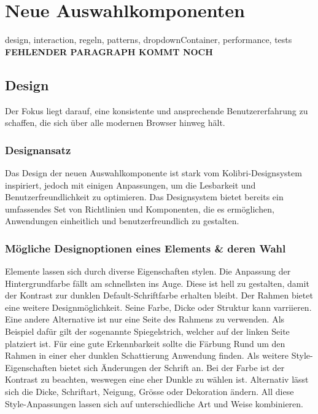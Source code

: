 \chapter{Neue Auswahlkomponenten}
\label{chap:newComponent}


design, interaction, regeln, patterns, dropdownContainer, performance, tests
{\color{red} \textbf{FEHLENDER PARAGRAPH KOMMT NOCH}}


\section{Design}
\label{sec:design}

Der Fokus liegt darauf, eine konsistente und ansprechende Benutzererfahrung zu schaffen, die sich über alle modernen Browser hinweg hält.


\subsection{Designansatz}
\label{sec:designIdea}

Das Design der neuen Auswahlkomponente ist stark vom Kolibri-Designsystem inspiriert, jedoch mit einigen Anpassungen, um die Lesbarkeit und Benutzerfreundlichkeit zu optimieren. 
Das Designsystem bietet bereits ein umfassendes Set von Richtlinien und Komponenten, die es ermöglichen, Anwendungen einheitlich und benutzerfreundlich zu gestalten.


\subsection{Mögliche Designoptionen eines Elements \& deren Wahl}
\label{sec:possibleDesignOptions}

Elemente lassen sich durch diverse Eigenschaften stylen.
Die Anpassung der Hintergrundfarbe fällt am schnellsten ins Auge.
Diese ist hell zu gestalten, damit der Kontrast zur dunklen Default-Schriftfarbe erhalten bleibt.
Der Rahmen bietet eine weitere Designmöglichkeit. 
Seine Farbe, Dicke oder Struktur kann varriieren. 
Eine andere Alternative ist nur eine Seite des Rahmens zu verwenden. 
Als Beispiel dafür gilt der sogenannte Spiegelstrich, welcher auf der linken Seite platziert ist.
Für eine gute Erkennbarkeit sollte die Färbung Rund um den Rahmen in einer eher dunklen Schattierung Anwendung finden.
Als weitere Style-Eigenschaften bietet sich Änderungen der Schrift an.
Bei der Farbe ist der Kontrast zu beachten, weswegen eine eher Dunkle zu wählen ist.
Alternativ lässt sich die Dicke, Schriftart, Neigung, Grösse oder Dekoration ändern.
All diese Style-Anpassungen lassen sich auf unterschiedliche Art und Weise kombinieren.

